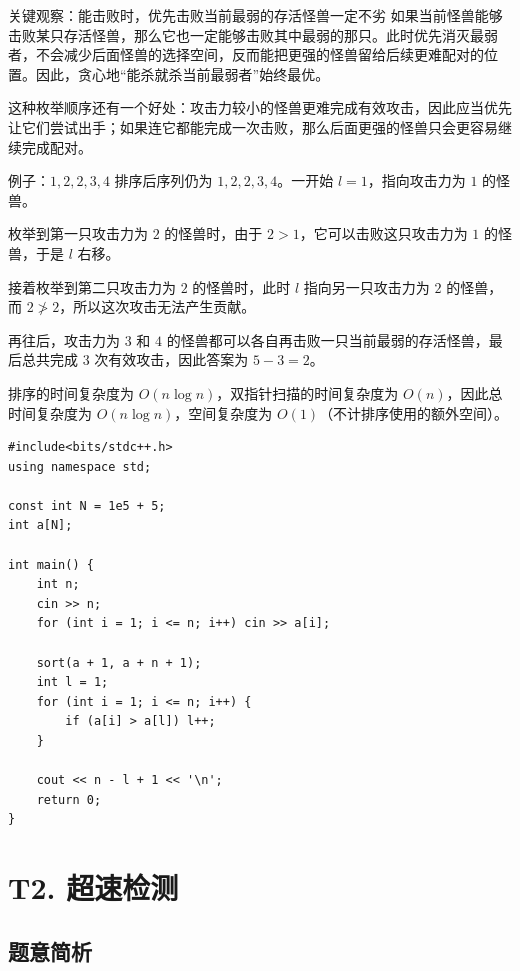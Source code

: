 \documentclass{book}
\begin{document}
    \begin{keybox}{关键观察：能击败时，优先击败当前最弱的存活怪兽一定不劣}
    如果当前怪兽能够击败某只存活怪兽，那么它也一定能够击败其中最弱的那只。此时优先消灭最弱者，不会减少后面怪兽的选择空间，反而能把更强的怪兽留给后续更难配对的位置。因此，贪心地“能杀就杀当前最弱者”始终最优。
    \end{keybox}

    这种枚举顺序还有一个好处：攻击力较小的怪兽更难完成有效攻击，因此应当优先让它们尝试出手；如果连它都能完成一次击败，那么后面更强的怪兽只会更容易继续完成配对。

    \begin{examplebox}{例子：\texorpdfstring{$1,2,2,3,4$}{1,2,2,3,4}}
    排序后序列仍为 $1,2,2,3,4$。一开始 $l=1$，指向攻击力为 $1$ 的怪兽。

    枚举到第一只攻击力为 $2$ 的怪兽时，由于 $2>1$，它可以击败这只攻击力为 $1$ 的怪兽，于是 $l$ 右移。

    接着枚举到第二只攻击力为 $2$ 的怪兽时，此时 $l$ 指向另一只攻击力为 $2$ 的怪兽，而 $2\not>2$，所以这次攻击无法产生贡献。

    再往后，攻击力为 $3$ 和 $4$ 的怪兽都可以各自再击败一只当前最弱的存活怪兽，最后总共完成 $3$ 次有效攻击，因此答案为 $5-3=2$。
    \end{examplebox}

    排序的时间复杂度为 $O(n\log n)$，双指针扫描的时间复杂度为 $O(n)$，因此总时间复杂度为 $O(n\log n)$，空间复杂度为 $O(1)$（不计排序使用的额外空间）。
    
    \begin{lstlisting}[style = code]
#include<bits/stdc++.h>
using namespace std;

const int N = 1e5 + 5;
int a[N];

int main() {
    int n;
    cin >> n;
    for (int i = 1; i <= n; i++) cin >> a[i];

    sort(a + 1, a + n + 1);
    int l = 1;
    for (int i = 1; i <= n; i++) {
        if (a[i] > a[l]) l++;
    }

    cout << n - l + 1 << '\n';
    return 0;
}
    \end{lstlisting}
    
    
    \newpage
    
    
    
    \section{T2. 超速检测}


    \subsection{题意简析}
    
\end{document}
